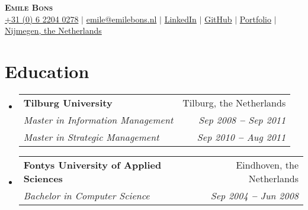 \documentclass[letterpaper,11pt]{article}
\makeatletter
\newcommand{\resumeItem}[1]{
  \item\small{
    {#1 \vspace{-2pt}}
  }
}
\newcommand{\resumeSubheading}[4]{
  \vspace{-2pt}\item
    \begin{tabular*}{0.97\textwidth}[t]{l@{\extracolsep{\fill}}r}
      \textbf{#1} & #2 \\
      \textit{\small#3} & \textit{\small #4} \\
    \end{tabular*}\vspace{-7pt}
}
\newcommand{\resumeEducationHeading}[6]{
  \vspace{-2pt}\item
    \begin{tabular*}{0.97\textwidth}[t]{l@{\extracolsep{\fill}}r}
      \textbf{#1} & #2 \\
      \textit{\small#3} & \textit{\small #4} \\
      \textit{\small#5} & \textit{\small #6} \\
    \end{tabular*}\vspace{-5pt}
}
\newcommand{\resumeSubHeadingListStart}{\begin{itemize}[leftmargin=0.15in, label={}]}
\newcommand{\resumeSubHeadingListEnd}{\end{itemize}}
\newcommand{\resumeItemListStart}{\begin{itemize}}
\newcommand{\resumeItemListEnd}{\end{itemize}\vspace{-5pt}}
\makeatother
\begin{document}

\begin{center}
    \textbf{\Huge \scshape Emile Bons} \\ \vspace{3pt}
    \small
    \faMobile \hspace{.5pt} \href{tel:+31622040278}{+31 (0) 6 2204 0278}
    $|$
    \faAt \hspace{.5pt} \href{mailto:emile@emilebons.nl}{emile@emilebons.nl}
    $|$
    \faLinkedinSquare \hspace{.5pt} \href{https://nl.linkedin.com/in/emilebons}{LinkedIn}
    $|$
    \faGithub \hspace{.5pt} \href{https://github.com/EmileBons}{GitHub}
    $|$
    \faGlobe \hspace{.5pt} \href{https://emilebons.nl}{Portfolio}
    $|$
    \faMapMarker \hspace{.5pt} \href{https://maps.app.goo.gl/sVYSKDKAeHRHD95v5}{Nijmegen, the Netherlands}
\end{center}




\section{Education}
  \vspace{3pt}
  \resumeSubHeadingListStart
    
    \resumeEducationHeading
      {Tilburg University
      }{Tilburg, the Netherlands}
      {Master in Information Management}{Sep 2008 \textbf{--} Sep 2011}
      {Master in Strategic Management}{Sep 2010 \textbf{--} Aug 2011}
    
    \resumeSubheading
      {Fontys University of Applied Sciences}{Eindhoven, the Netherlands}
      {Bachelor in Computer Science}{Sep 2004 \textbf{--} Jun 2008}
    
  \resumeSubHeadingListEnd
\end{document}
